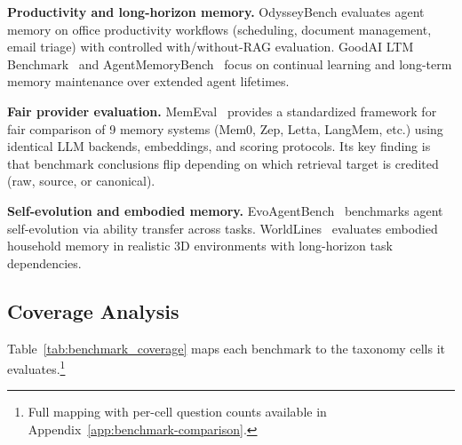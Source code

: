 \textbf{Productivity and long-horizon memory.} OdysseyBench evaluates agent memory on office productivity workflows (scheduling, document management, email triage) with controlled with/without-RAG evaluation. GoodAI LTM Benchmark~\cite{Unknown2026GoodAILTM} and AgentMemoryBench~\cite{Unknown2026AgentMemoryBench} focus on continual learning and long-term memory maintenance over extended agent lifetimes.

\textbf{Fair provider evaluation.} MemEval~\cite{Unknown2026MemEval} provides a standardized framework for fair comparison of 9 memory systems (Mem0, Zep, Letta, LangMem, etc.) using identical LLM backends, embeddings, and scoring protocols. Its key finding is that benchmark conclusions flip depending on which retrieval target is credited (raw, source, or canonical).

\textbf{Self-evolution and embodied memory.} EvoAgentBench~\cite{Unknown2026EvoAgentBench} benchmarks agent self-evolution via ability transfer across tasks. WorldLines~\cite{Unknown2026WorldLines} evaluates embodied household memory in realistic 3D environments with long-horizon task dependencies.

\subsection{Coverage Analysis}

Table~\ref{tab:benchmark_coverage} maps each benchmark to the taxonomy cells it evaluates.\footnote{Full mapping with per-cell question counts available in Appendix~\ref{app:benchmark-comparison}.}

